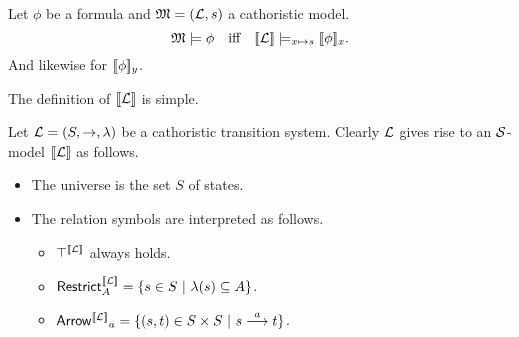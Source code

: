 \begin{theorem}\label{correspondence:theorem:1}
Let $\phi$ be a \cathoristic{} formula and $\frak{M} = (\mathcal{L}, s)$ a cathoristic
model.
\[
   \frak{M} \models \phi \quad  \text{iff} \quad \lbrack\!\lbrack \mathcal{L} \rbrack\!\rbrack \models_{x \mapsto s} \lbrack\!\lbrack \phi \rbrack\!\rbrack_x.
\]
And likewise for $\lbrack\!\lbrack \phi \rbrack\!\rbrack_y$.
\end{theorem}

\NI The definition of $\lbrack\!\lbrack \mathcal{L} \rbrack\!\rbrack$ is simple.

\begin{definition}
Let $\mathcal{L} = (S, \rightarrow, \lambda)$ be a cathoristic transition
system. Clearly $\mathcal{L}$ gives rise to an $\mathcal{S}$-model $\lbrack\!\lbrack \mathcal{L} \rbrack\!\rbrack$ as
follows.
\begin{itemize}

\item The universe is the set $S$ of states.

\item The relation symbols are interpreted as follows.

  \begin{itemize}

    \item $\top^{\lbrack\!\lbrack \mathcal{L} \rbrack\!\rbrack}$ always holds.

    \item $\mathsf{Restrict}_{A}^{\lbrack\!\lbrack \mathcal{L} \rbrack\!\rbrack} = \{ s \in S\ |\ \lambda(s) \subseteq A\}$.

    \item $\mathsf{Arrow^{\lbrack\!\lbrack \mathcal{L} \rbrack\!\rbrack}}_{a} = \{(s, t) \in S \times S\ |\ s \stackrel{a}{\longrightarrow} t\}$.

  \end{itemize}
\end{itemize}
\end{definition}

